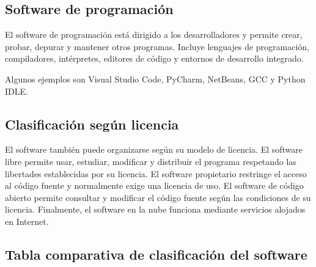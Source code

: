 \documentclass[12pt,a4paper]{article}
\begin{document}
	\subsection{Software de programación}
	
	El software de programación está dirigido a los desarrolladores y permite crear, probar, depurar y mantener otros programas. Incluye lenguajes de programación, compiladores, intérpretes, editores de código y entornos de desarrollo integrado.
	
	Algunos ejemplos son Visual Studio Code, PyCharm, NetBeans, GCC y Python IDLE.
	
	\subsection{Clasificación según licencia}
	
	El software también puede organizarse según su modelo de licencia. El software libre permite usar, estudiar, modificar y distribuir el programa respetando las libertades establecidas por su licencia. El software propietario restringe el acceso al código fuente y normalmente exige una licencia de uso. El software de código abierto permite consultar y modificar el código fuente según las condiciones de su licencia. Finalmente, el software en la nube funciona mediante servicios alojados en Internet.
	
	\subsection{Tabla comparativa de clasificación del software}
	
\end{document}
